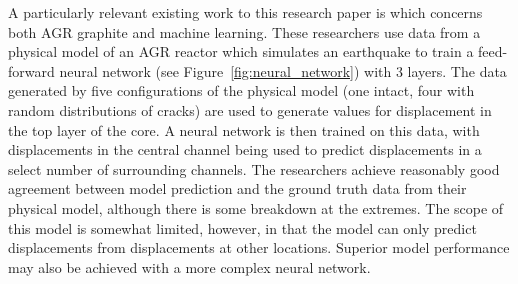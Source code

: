 \noindent
A particularly relevant existing work to this research paper is \cite{dihoru2018neural} which concerns both AGR graphite and machine learning. These researchers use data from a physical model of an AGR reactor which simulates an earthquake to train a feed-forward neural network (see Figure~\ref{fig:neural_network}) with 3 layers. The data generated by five configurations of the physical model (one intact, four with random distributions of cracks) are used to generate values for displacement in the top layer of the core. A neural network is then trained on this data, with displacements in the central channel being used to predict displacements in a select number of surrounding channels. The researchers achieve reasonably good agreement between model prediction and the ground truth data from their physical model, although there is some breakdown at the extremes. The scope of this model is somewhat limited, however, in that the model can only predict displacements from displacements at other locations. Superior model performance may also be achieved with a more complex neural network.  
